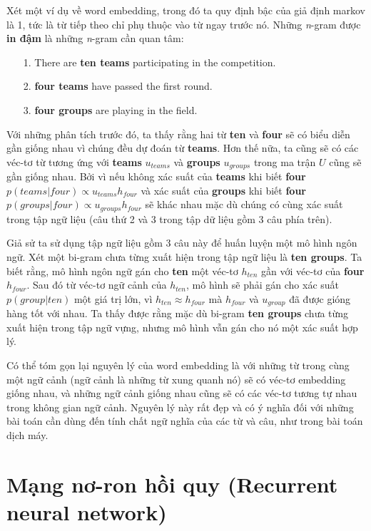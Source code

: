 Xét một ví dụ về word embedding, trong đó ta quy định bậc của giả định markov là 1, tức là từ tiếp theo chỉ phụ thuộc vào từ ngay trước nó. Những \textit{n}-gram được \textbf{in đậm} là những \textit{n}-gram cần quan tâm:
\begin{itemize}
	\item[1.] There are \textbf{ten teams} participating in the competition.
	\item[2.] \textbf{four teams} have passed the first round.
	\item[3.] \textbf{four groups} are playing in the field.
\end{itemize}

Với những phân tích trước đó, ta thấy rằng hai từ \textbf{ten} và \textbf{four} sẽ có biểu diễn gần giống nhau vì chúng đều dự đoán từ \textbf{teams}. Hơn thế nữa, ta cũng sẽ có các véc-tơ từ tương ứng với \textbf{teams} $u_{teams}$ và \textbf{groups} $u_{groups}$ trong ma trận $U$ cũng sẽ gần giống nhau. Bởi vì nếu không xác suất của \textbf{teams} khi biết \textbf{four} $p(teams|four) \propto u_{teams}h_{four}$ và xác suất của \textbf{groups} khi biết \textbf{four} $p(groups|four) \propto u_{groups}h_{four}$ sẽ khác nhau mặc dù chúng có cùng xác suất trong tập ngữ liệu (câu thứ 2 và 3 trong tập dữ liệu gồm 3 câu phía trên).

Giả sử ta sử dụng tập ngữ liệu gồm 3 câu này để huấn luyện một mô hình ngôn ngữ. Xét một bi-gram chưa từng xuất hiện trong tập ngữ liệu là \textbf{ten groups}. Ta biết rằng, mô hình ngôn ngữ gán cho \textbf{ten} một véc-tơ $h_{ten}$ gần với véc-tơ của \textbf{four} $h_{four}$. Sau đó từ véc-tơ ngữ cảnh của $h_{ten}$, mô hình sẽ phải gán cho xác suất $p(group|ten)$ một giá trị lớn, vì $h_{ten} \approx h_{four}$ mà $h_{four}$ và $u_{group}$ đã được gióng hàng tốt với nhau. Ta thấy được rằng mặc dù bi-gram \textbf{ten groups} chưa từng xuất hiện trong tập ngữ vựng, nhưng mô hình vẫn gán cho nó một xác suất hợp lý. 

Có thể tóm gọn lại nguyên lý của word embedding là với những từ trong cùng một ngữ cảnh (ngữ cảnh là những từ xung quanh nó) sẽ có véc-tơ embedding giống nhau, và những ngữ cảnh giống nhau cũng sẽ có các véc-tơ tương tự nhau trong không gian ngữ cảnh. Nguyên lý này rất đẹp và có ý nghĩa đối với những bài toán cần dùng đến tính chất ngữ nghĩa của các từ và câu, như trong bài toán dịch máy.


\section{Mạng nơ-ron hồi quy (Recurrent neural network)} \label{rnnsection}

